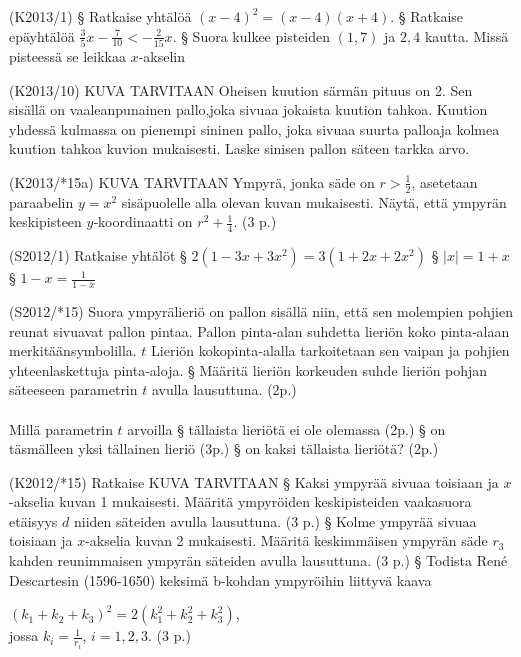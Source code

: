 \begin{tehtava} (K2013/1)
\alakohdat
		§ Ratkaise yhtälöä $(x-4)^2=(x-4)(x+4)$.
		§ Ratkaise epäyhtälöä $\frac{3}{5}x-\frac{7}{10} < -\frac{2}{15}x$.
		§ Suora kulkee pisteiden $(1,7)$ ja $2,4$ kautta. Missä pisteessä se leikkaa $x$-akselin
	\loppu
\end{tehtava}


\begin{tehtava}(K2013/10) KUVA TARVITAAN
Oheisen kuution särmän pituus on 2. Sen sisällä on vaaleanpunainen pallo,joka sivuaa jokaista kuution tahkoa. Kuution yhdessä kulmassa on pienempi sininen pallo, joka sivuaa suurta palloaja kolmea kuution tahkoa kuvion mukaisesti. Laske sinisen pallon säteen tarkka arvo. 
\end{tehtava}


\begin{tehtava}(K2013/*15a) KUVA TARVITAAN
Ympyrä, jonka säde on $r>\frac{1}{2}$, asetetaan paraabelin $y=x^2$ sisäpuolelle alla olevan kuvan mukaisesti. Näytä, että ympyrän keskipisteen $y$‐koordinaatti on $r^2+\frac{1}{4}. $ (3
p.)
\end{tehtava}

\begin{tehtava} (S2012/1) Ratkaise yhtälöt
  \alakohdat
		§ $2(1-3x+3x^2)=3(1+2x+2x^2)$
		§ $|x|=1+x$
		§ $1-x=\frac{1}{1-x}$	
  \loppu
\end{tehtava}

\begin{tehtava}(S2012/*15)
Suora ympyrälieriö on pallon sisällä niin, että sen molempien pohjien reunat sivuavat pallon pintaa. Pallon pinta‐alan suhdetta lieriön koko pinta‐alaan merkitäänsymbolilla. $t$ Lieriön kokopinta‐alalla tarkoitetaan sen vaipan ja pohjien yhteenlaskettuja pinta‐aloja. 
\alakohdat
		§ Määritä lieriön korkeuden suhde lieriön pohjan säteeseen parametrin $t$ avulla lausuttuna. (2p.) \\
		\\
		Millä parametrin $t$ arvoilla
		§ tällaista lieriötä ei ole olemassa (2p.)
		§ on täsmälleen yksi tällainen lieriö (3p.)	
		§ on kaksi tällaista lieriötä? (2p.)	
  \loppu
\end{tehtava}

\begin{tehtava} (K2012/*15) Ratkaise   KUVA TARVITAAN
\alakohdat
		§ Kaksi ympyrää sivuaa toisiaan ja $x$-akselia kuvan 1 mukaisesti. Määritä ympyröiden keskipisteiden vaakasuora etäisyys $d$ niiden säteiden avulla lausuttuna. (3 p.)
		§ Kolme ympyrää sivuaa toisiaan ja $x$-akselia kuvan 2 mukaisesti. Määritä keskimmäisen ympyrän säde $r_3$ kahden reunimmaisen ympyrän säteiden avulla lausuttuna. (3 p.)
		§ Todista René Descartesin (1596-1650) keksimä b-kohdan ympyröihin liittyvä kaava
		
		$(k_1+k_2+k_3)^2=2(k_1^2+k_2^2+k_3^2)$, \\
		jossa $k_i=\frac{1}{r_i}$,  $i=1,2,3.$ (3 p.)
	\loppu
\end{tehtava}


